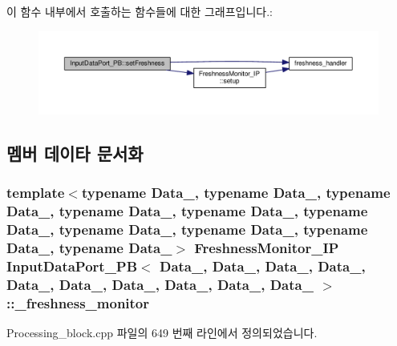 이 함수 내부에서 호출하는 함수들에 대한 그래프입니다.\+:\nopagebreak
\begin{figure}[H]
\begin{center}
\leavevmode
\includegraphics[width=350pt]{classInputDataPort__PB_afc60b73a230f505302984dd8421db791_cgraph}
\end{center}
\end{figure}




\subsection{멤버 데이타 문서화}
\subsubsection[{\texorpdfstring{\+\_\+freshness\+\_\+monitor}{_freshness_monitor}}]{\setlength{\rightskip}{0pt plus 5cm}template$<$typename Data\+\_, typename Data\+\_, typename Data\+\_, typename Data\+\_, typename Data\+\_, typename Data\+\_, typename Data\+\_, typename Data\+\_, typename Data\+\_, typename Data\+\_$>$ {\bf Freshness\+Monitor\+\_\+\+IP} {\bf Input\+Data\+Port\+\_\+\+PB}$<$ Data\+\_, Data\+\_, Data\+\_, Data\+\_, Data\+\_, Data\+\_, Data\+\_, Data\+\_, Data\+\_, Data\+\_ $>$\+::\+\_\+freshness\+\_\+monitor\hspace{0.3cm}{\ttfamily [private]}}\hypertarget{classInputDataPort__PB_a38da6f4f194f3849420cdbcc5db2019a}{}\label{classInputDataPort__PB_a38da6f4f194f3849420cdbcc5db2019a}


Processing\+\_\+block.\+cpp 파일의 649 번째 라인에서 정의되었습니다.

